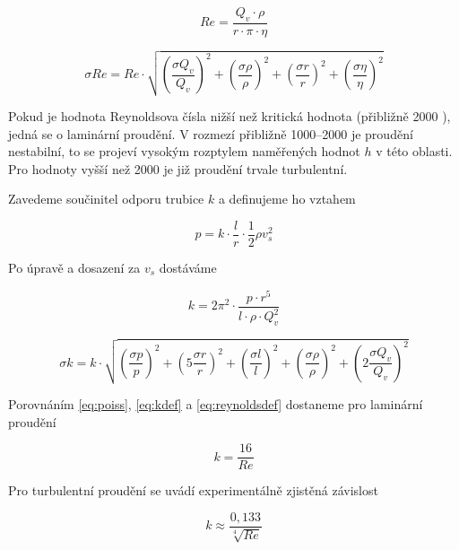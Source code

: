 \begin{equation} \label{eq:reynoldsvypocet}
Re=\frac{Q_v \cdot \rho}{r \cdot \pi \cdot \eta}
\end{equation}

\begin{equation} \label{eq:reynoldschyba}
\sigma Re=Re \cdot \sqrt{      \left(\frac{\sigma Q_v}{Q_v} \right)^2+        \left(\frac{\sigma \rho}{\rho}\right)^2+        \left(\frac{\sigma r}{r}\right)^2+        \left(\frac{\sigma \eta}{\eta}\right)^2}
\end{equation}


Pokud je hodnota Reynoldsova čísla nižší než kritická hodnota (přibližně 2000 \cite{ZFP}), jedná se o laminární proudění. V rozmezí přibližně 1000--2000 \cite{ZFP} je proudění nestabilní, to se projeví vysokým rozptylem naměřených hodnot $h$ v této oblasti. Pro hodnoty vyšší než 2000 je již proudění trvale turbulentní.

Zavedeme součinitel odporu trubice $k$ a definujeme ho vztahem\cite{ZFP}

\begin{equation} \label{eq:kdef}
p=k \cdot \frac{l}{r} \cdot \frac{1}{2} \rho v_s^2
\end{equation}

Po úpravě a dosazení za $v_s$ dostáváme

\begin{equation}\label{eq:kvypocet}
k= 2\pi^2 \cdot \frac{p \cdot r^5}{l \cdot \rho \cdot Q_v^2}
\end{equation}

\begin{equation}\label{eq:kchyba}
\sigma k = k \cdot \sqrt{      \left(\frac{\sigma p}{p} \right)^2+        \left(5\frac{\sigma r}{r}\right)^2+        \left(\frac{\sigma l}{l}\right)^2+        \left(\frac{\sigma \rho}{\rho}\right)^2  +      \left(2\frac{\sigma Q_v}{Q_v}\right)^2}
\end{equation}

Porovnáním \eqref{eq:poiss}, \eqref{eq:kdef} a \eqref{eq:reynoldsdef} dostaneme pro laminární proudění

\begin{equation}\label{eq:klaminarni}
k=\frac{16}{Re}
\end{equation}

Pro turbulentní proudění se uvádí experimentálně zjistěná závislost\cite{ZFP}

\begin{equation}\label{eq:kturbulentni}
k \approx \frac{0,133}{\sqrt[4]{Re}}
\end{equation}










